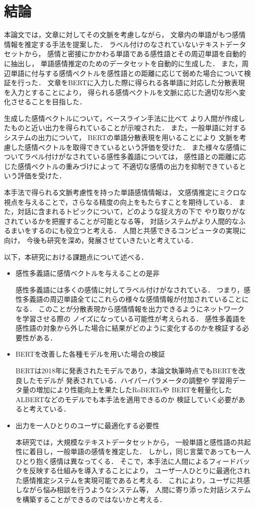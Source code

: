 \chapter{結論}
本論文では，文章に対してその文脈を考慮しながら，
文章内の単語がもつ感情情報を推定する手法を提案した．
ラベル付けのなされていないテキストデータセットから，
感情と密接にかかわる単語である感性語とその周辺単語を自動的に抽出し，
単語感情推定のためのデータセットを自動的に生成した．
また，周辺単語に付与する感情ベクトルを感性語との距離に応じて弱めた場合について検証を行った．
文章をBERTに入力した際に得られる各単語に対応した分散表現を入力とすることにより，
得られる感情ベクトルを文脈に応じた適切な形へ変化させることを目指した．

生成した感情ベクトルについて，ベースライン手法に比べて
より人間が作成したものと近い出力を得られていることが示唆された．
また，一般単語に対するシステムの出力について，
BERTの単語分散表現を用いることにより
文脈を考慮した感情ベクトルを取得できているという評価を受けた．
また様々な感情についてラベル付けがなされている感性多義語については，
感性語との距離に応じた感情ベクトルの重みづけによって
不適切な感情の出力を抑制できているという評価を受けた．

本手法で得られる文脈考慮性を持った単語感情情報は，
文感情推定にミクロな視点を与えることで，さらなる精度の向上をもたらすことを期待している．
また，対話に含まれるトピックについて，どのような捉え方の下で
やり取りがなされているかを把握することが可能となる等，
対話システムがより人間的なふるまいをするのにも役立つと考える．
人間と共感できるコンピュータの実現に向け，
今後も研究を深め，発展させていきたいと考えている．

以下，本研究における課題点について述べる．
\begin{itemize}
	\item 感性多義語に感情ベクトルを与えることの是非
	\par 感性多義語には多くの感情に対してラベル付けがなされている．
	つまり，感性多義語の周辺単語全てにこれらの様々な感情情報が付加されていることになる．
	このことが分散表現から感情情報を出力できるようにネットワークを学習させる際の
	ノイズになっている可能性が考えられる．
	感性多義語を感性語の対象から外した場合に結果がどのように変化するのかを検証する必要性がある．
	\item BERTを改善した各種モデルを用いた場合の検証
	\par BERTは2018年に発表されたモデルであり，本論文執筆時点でもBERTを改良したモデルが
	発表されている．ハイパーパラメータの調整や
	学習用データ量の増加により性能向上を果たしたRoBERTa\cite{roberta}や
	BERTを軽量化したALBERT\cite{albert}などのモデルでも本手法を適用できるのか
	検証していく必要があると考えている．
	\item 出力を一人ひとりのユーザに最適化する必要性
	\par 本研究では，大規模なテキストデータセットから，
	一般単語と感性語の共起性に着目し，一般単語の感情を推定した．
	しかし，同じ言葉であっても一人ひとり抱く感情は異なってくる．
	そこで，本手法に人間によるフィードバックを反映する仕組みを導入することにより，
	ユーザ一人ひとりに最適化された感情推定システムを実現可能であると考える．
	これにより，ユーザに共感しながら悩み相談を行うようなシステム等，
	人間に寄り添った対話システムを構築することができるのではないかと考える．
\end{itemize}